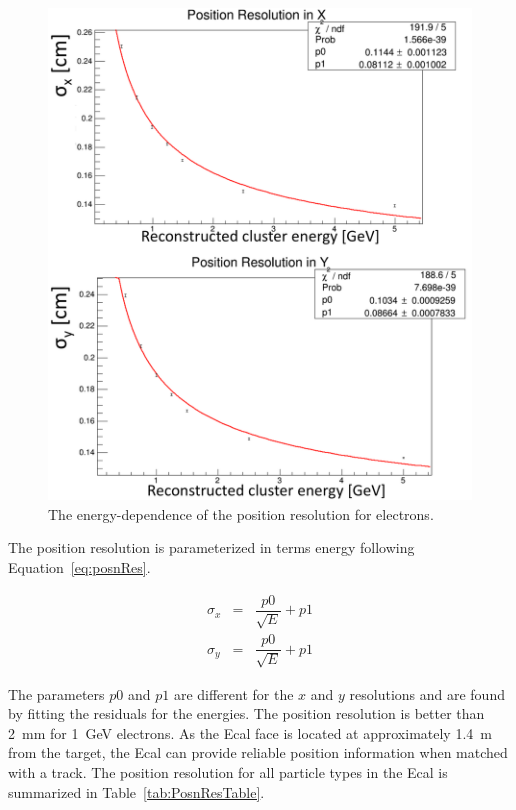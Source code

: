 \begin{figure}[H]
  \centering
      \includegraphics[width=1.0\textwidth]{pics/performance/emPosnResn.png}
  \caption[Energy-dependent position resolution for electrons.]{The energy-dependence of the position resolution for electrons.}
  \label{Figure:emPosnResn}
\end{figure}

The position resolution is parameterized in terms energy following Equation~\eqref{eq:posnRes}.
 
\begin{eqnarray*}
\label{eq:posnRes}
\sigma_x & = & \dfrac{p0}{\sqrt{E}}+p1\\
\sigma_y & = & \dfrac{p0}{\sqrt{E}}+p1
\end{eqnarray*}

The parameters $p0$ and $p1$ are different for the $x$ and $y$ resolutions and are found by fitting the residuals for the energies. The position resolution is better than 2~mm for 1~GeV electrons. As the Ecal face is located at  approximately 1.4~m from the target, the Ecal can provide reliable position information when matched with a track. The position resolution for all particle types in the Ecal is summarized in Table~\ref{tab:PosnResTable}. 

